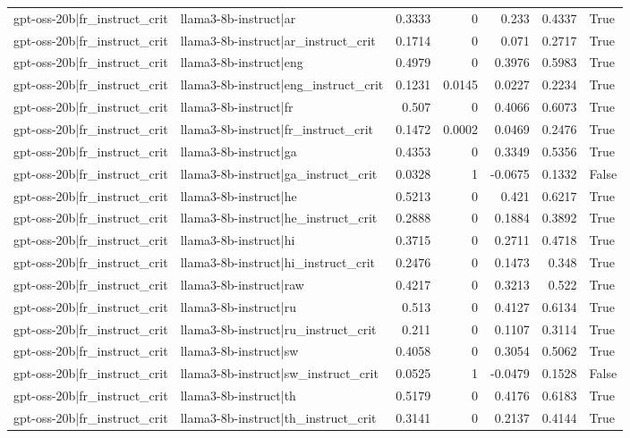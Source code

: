 \begin{table}
\begin{tabular}{l l r r r r l}
gpt-oss-20b|fr_instruct_crit & llama3-8b-instruct|ar & 0.3333 & 0 & 0.233 & 0.4337 & True \\
gpt-oss-20b|fr_instruct_crit & llama3-8b-instruct|ar_instruct_crit & 0.1714 & 0 & 0.071 & 0.2717 & True \\
gpt-oss-20b|fr_instruct_crit & llama3-8b-instruct|eng & 0.4979 & 0 & 0.3976 & 0.5983 & True \\
gpt-oss-20b|fr_instruct_crit & llama3-8b-instruct|eng_instruct_crit & 0.1231 & 0.0145 & 0.0227 & 0.2234 & True \\
gpt-oss-20b|fr_instruct_crit & llama3-8b-instruct|fr & 0.507 & 0 & 0.4066 & 0.6073 & True \\
gpt-oss-20b|fr_instruct_crit & llama3-8b-instruct|fr_instruct_crit & 0.1472 & 0.0002 & 0.0469 & 0.2476 & True \\
gpt-oss-20b|fr_instruct_crit & llama3-8b-instruct|ga & 0.4353 & 0 & 0.3349 & 0.5356 & True \\
gpt-oss-20b|fr_instruct_crit & llama3-8b-instruct|ga_instruct_crit & 0.0328 & 1 & -0.0675 & 0.1332 & False \\
gpt-oss-20b|fr_instruct_crit & llama3-8b-instruct|he & 0.5213 & 0 & 0.421 & 0.6217 & True \\
gpt-oss-20b|fr_instruct_crit & llama3-8b-instruct|he_instruct_crit & 0.2888 & 0 & 0.1884 & 0.3892 & True \\
gpt-oss-20b|fr_instruct_crit & llama3-8b-instruct|hi & 0.3715 & 0 & 0.2711 & 0.4718 & True \\
gpt-oss-20b|fr_instruct_crit & llama3-8b-instruct|hi_instruct_crit & 0.2476 & 0 & 0.1473 & 0.348 & True \\
gpt-oss-20b|fr_instruct_crit & llama3-8b-instruct|raw & 0.4217 & 0 & 0.3213 & 0.522 & True \\
gpt-oss-20b|fr_instruct_crit & llama3-8b-instruct|ru & 0.513 & 0 & 0.4127 & 0.6134 & True \\
gpt-oss-20b|fr_instruct_crit & llama3-8b-instruct|ru_instruct_crit & 0.211 & 0 & 0.1107 & 0.3114 & True \\
gpt-oss-20b|fr_instruct_crit & llama3-8b-instruct|sw & 0.4058 & 0 & 0.3054 & 0.5062 & True \\
gpt-oss-20b|fr_instruct_crit & llama3-8b-instruct|sw_instruct_crit & 0.0525 & 1 & -0.0479 & 0.1528 & False \\
gpt-oss-20b|fr_instruct_crit & llama3-8b-instruct|th & 0.5179 & 0 & 0.4176 & 0.6183 & True \\
gpt-oss-20b|fr_instruct_crit & llama3-8b-instruct|th_instruct_crit & 0.3141 & 0 & 0.2137 & 0.4144 & True \\

\end{tabular}
\end{table}
